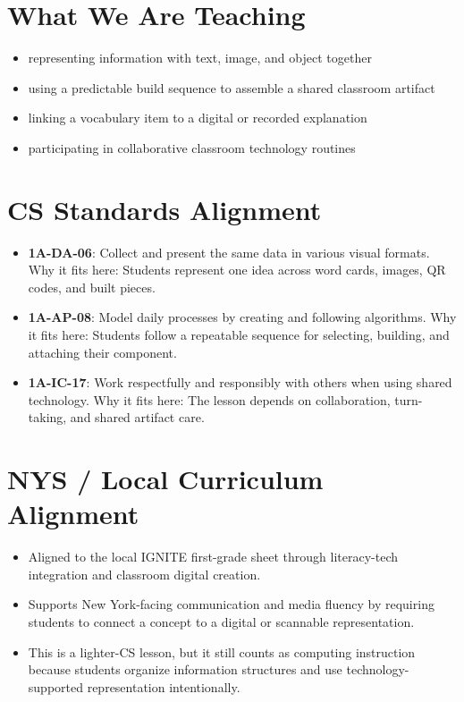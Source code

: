\documentclass[11pt]{article}
\begin{document}
\section*{What We Are Teaching}
\begin{itemize}[leftmargin=*]
\item representing information with text, image, and object together
\item using a predictable build sequence to assemble a shared classroom artifact
\item linking a vocabulary item to a digital or recorded explanation
\item participating in collaborative classroom technology routines
\end{itemize}

\section*{CS Standards Alignment}
\begin{itemize}[leftmargin=*]
\item \textbf{1A-DA-06}: Collect and present the same data in various visual formats. Why it fits here: Students represent one idea across word cards, images, QR codes, and built pieces.
\item \textbf{1A-AP-08}: Model daily processes by creating and following algorithms. Why it fits here: Students follow a repeatable sequence for selecting, building, and attaching their component.
\item \textbf{1A-IC-17}: Work respectfully and responsibly with others when using shared technology. Why it fits here: The lesson depends on collaboration, turn-taking, and shared artifact care.
\end{itemize}

\section*{NYS / Local Curriculum Alignment}
\begin{itemize}[leftmargin=*]
\item Aligned to the local IGNITE first-grade sheet through literacy-tech integration and classroom digital creation.
\item Supports New York-facing communication and media fluency by requiring students to connect a concept to a digital or scannable representation.
\item This is a lighter-CS lesson, but it still counts as computing instruction because students organize information structures and use technology-supported representation intentionally.
\end{itemize}
\end{document}
